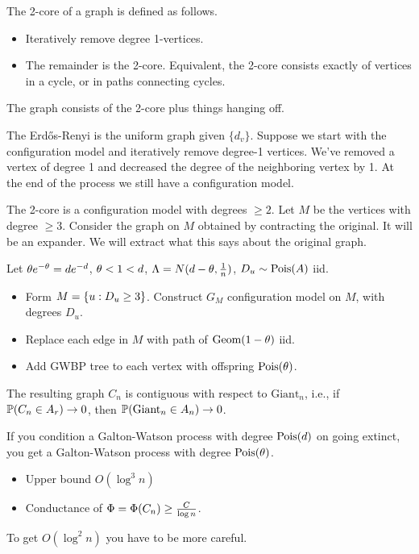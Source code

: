 The 2-core of a graph is defined as follows.
\begin{itemize}
\item
Iteratively remove degree 1-vertices.
\item 
The remainder is the 2-core. 
Equivalent, the 2-core consists exactly of vertices in a cycle, or in paths connecting cycles.
\end{itemize}
The graph consists of the 2-core plus things hanging off. 

The Erd\H os-Renyi is the uniform graph given $\{d_v\}$. Suppose we start with the configuration model and iteratively remove degree-1 vertices.
We've removed a vertex of degree 1 and decreased the degree of the neighboring vertex by 1. At the end of the process we still have a configuration model.

The 2-core is a configuration model with degrees $\ge 2$. Let $M$ be the vertices with degree $\ge 3$. Consider the graph on $M$ obtained by contracting the original. It will be an expander. We will extract what this says about the original graph.

\begin{thm}
Let $\theta e^{-\theta} = de^{-d}$, $\theta <1<d$, $\Lambda = N(d-\theta, \frac{1}{n})$, $D_u \sim \operatorname{Pois}(A)$ iid.
\begin{itemize}
\item
Form $M=\left\{{u}:{D_u\ge 3}\right\}$. Construct $G_M$ configuration model on $M$, with degrees $D_u$.
\item
Replace each edge in $M$ with path of $\text{Geom}(1-\theta)$ iid.
\item
Add GWBP tree to each vertex with offspring $\operatorname{Pois}(\theta)$.
\end{itemize}
The resulting graph $C_n$ is contiguous with respect to $\text{Giant}_n$, i.e., if $\mathbb{P}(C_n\in A_r)\to 0$, then $\mathbb{P}(\text{Giant}_n \in A_n)\to 0$.
\end{thm}
If you condition a Galton-Watson process with degree $\operatorname{Pois}(d)$ on going extinct, you get a Galton-Watson process with degree $\operatorname{Pois}(\theta)$.

\begin{itemize}
\item
Upper bound $O(\log^3n)$
\item
Conductance of $\Phi=\Phi(C_n) \ge \frac{C}{\log n}$. 
\end{itemize}
To get $O(\log^2n)$ you have to be more careful.

